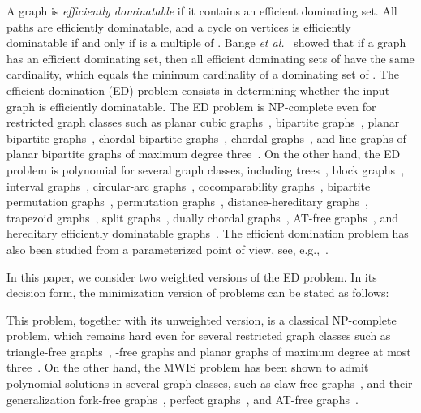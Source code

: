 \documentclass[]{elsarticle}
\newcommand{\NP}{\textsf{NP}}
\begin{document}
A graph is \emph{efficiently dominatable} if it contains an efficient dominating set.
All paths are efficiently dominatable, and a cycle  on  vertices is efficiently dominatable if and only if  is a multiple of .
Bange \emph{et al.}~\cite{BBS88} showed that if a graph  has an efficient dominating set, then all efficient dominating sets of  have the same cardinality, which equals the minimum cardinality of a dominating set of . 
The efficient domination (ED) problem consists in determining whether the input graph is efficiently dominatable. 
The ED problem is \NP-complete even for restricted graph classes such as planar cubic graphs~\cite{Kratochvil91}, bipartite graphs~\cite{YL96}, planar bipartite graphs~\cite{LT02}, chordal bipartite graphs~\cite{LT02}, chordal graphs~\cite{YL96}, and line graphs of planar bipartite graphs of maximum degree three~\cite{BHN}.
On the other hand, the ED problem is polynomial for several graph classes, including trees~\cite{BBS88,FH91}, block graphs~\cite{YL96}, interval graphs~\cite{CL94, CRC95, KE00, KMM95}, circular-arc graphs~\cite{CL94,KE00}, cocomparability graphs~\cite{C97,CRC95}, bipartite permutation graphs~\cite{LT02}, permutation graphs~\cite{LLT97}, distance-hereditary graphs~\cite{LT02}, trapezoid graphs~\cite{LLT97,L98}, split graphs~\cite{CL93}, dually chordal graphs~\cite{BLR}, AT-free graphs~\cite{BLR,BKM99}, and hereditary efficiently dominatable graphs~\cite{Milanic}.
The efficient domination problem has also been studied from a parameterized point of view, see, e.g.,~\cite{Cesati,Guo-Niedermeier}.

In this paper, we consider two weighted versions of the ED problem.
In its decision form, the minimization version of problems can be stated as follows:

\medskip
\begin{center}
\fbox{\parbox{0.85\linewidth}{\noindent
{\sc Minimum Weight Efficient Dominating Set (Min-WED)}\.8ex]
\begin{tabular*}{.93\textwidth}{rl}
\emph{Input:} & A tuple  consisting of a graph , \\ & vertex weights , and an integer .\\
\emph{Question:} & Does  contain an independent set  such that ?
\end{tabular*}
}}
\end{center}
\medskip

This problem, together with its unweighted version, is a classical \NP-complete problem, which remains hard even for several restricted graph classes such as triangle-free graphs~\cite{Pol74}, -free graphs \cite{Min80} and planar graphs of maximum degree at most three~\cite{GJ77}.
On the other hand, the MWIS problem has been shown to admit polynomial solutions in several graph classes, such as claw-free graphs~\cite{Min80,NT01,OPS08}, and their generalization fork-free graphs~\cite{LM08}, perfect graphs~\cite{GLS84}, and AT-free graphs~\cite{BKM99}.
\end{document}
